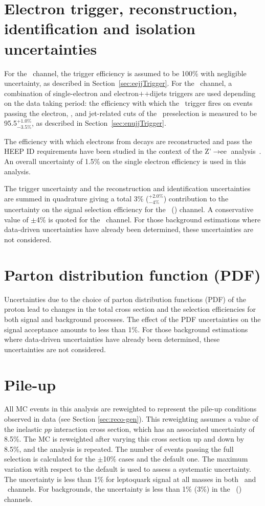 \section{Electron trigger, reconstruction, identification and isolation uncertainties}  \label{sec:EleHLTIDIsoUncer}

For the \eejj~channel, the trigger efficiency is assumed to be 100\% with negligible uncertainty, 
as described in Section~\ref{sec:eejjTrigger}.
For the \enujj~channel, a combination of single-electron and electron$+$\MET$+$dijets 
triggers are used depending on the data taking period: 
the efficiency with which the \enujj~trigger fires on events passing the electron, \met,
and jet-related cuts of the \enujj~preselection is measured to be 95.5$^{+1.0\%}_{-3.5\%}$, as 
described in Section~\ref{sec:enujjTrigger}.

The efficiency with which electrons from \PZz decays are 
reconstructed and pass the HEEP ID requirements have been
studied in the context of the Z'$\rightarrow \mbox{ee}$ 
analysis~\cite{zprime-2011}.
An overall uncertainty of 1.5\% on the single electron efficiency is used in this analysis. 

The trigger uncertainty and the reconstruction and identification uncertainties are summed in quadrature 
giving a total 3\% ($^{+2.0\%}_{-4\%}$) contribution to the 
uncertainty on the signal selection efficiency for the \eejj~(\enujj) channel.
A conservative value of $\pm$4\% is quoted for  the \enujj~channel.
For those background estimations where data-driven uncertainties have 
already been determined, these uncertainties are not considered.

\section{Parton distribution function (PDF)} 
Uncertainties due to the choice of parton distribution functions (PDF) of the proton lead to changes 
in the total cross section and the selection efficiencies for both signal and background processes. 
The effect of the PDF uncertainties on the signal acceptance amounts to less than 1\%.
For those background estimations where data-driven uncertainties have 
already been determined, these uncertainties are not considered.

\section{Pile-up} 
\label{sec:pile-up-uncertainty}
All MC events in this analysis are reweighted 
to represent the pile-up conditions observed in data (see Section \ref{sec:reco-gen}).
This reweighting assumes a value of the inelastic $pp$ interaction
cross section, which has an associated uncertainty of 8.5\%.
The MC is reweighted after varying this cross section up and down by 8.5\%,
and the analysis is repeated.
The number of events passing the full selection is calculated 
for the $\pm$10\% cases and the default one. 
The maximum variation with respect to the default is used to assess a systematic uncertainty.
The uncertainty is less than 1\% for leptoquark signal at all masses in both \eejj~and \enujj~channels.
For backgrounds, the uncertainty is less than 1\% (3\%) in the \eejj~(\enujj) channels.

